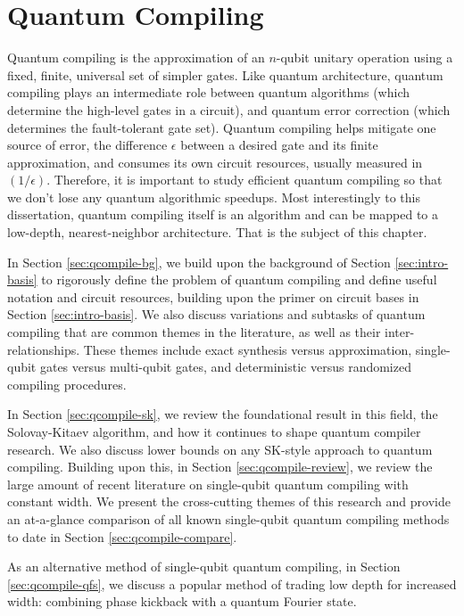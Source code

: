 \chapter{Quantum Compiling}
\label{chap:qcompile}

Quantum compiling is the approximation of an $n$-qubit
unitary operation using a fixed, finite, universal set
of simpler gates. Like quantum architecture, quantum
compiling plays an intermediate role between quantum
algorithms (which determine the high-level gates in a circuit),
and quantum error correction (which determines the
fault-tolerant gate set).
Quantum compiling helps mitigate one source of error,
the difference $\epsilon$ between a desired gate and its
finite approximation,
and consumes its own circuit resources, usually measured in
$(1 / \epsilon)$.
Therefore, it is important to study efficient quantum 
compiling so that we don't lose any quantum algorithmic speedups.
Most interestingly to this dissertation, quantum compiling itself
is an algorithm and can be mapped to a low-depth, nearest-neighbor
architecture. That is the subject of this chapter.

In Section \ref{sec:qcompile-bg}, we build upon the background
of Section \ref{sec:intro-basis} to rigorously define the problem of
quantum compiling and define useful notation and circuit resources,
building upon the primer on circuit bases in Section \ref{sec:intro-basis}.
We also discuss
variations and subtasks of quantum compiling that are common themes
in the literature, as well as their inter-relationships.
These themes include exact synthesis versus approximation,
single-qubit gates versus multi-qubit gates, and deterministic
versus randomized compiling procedures.

In Section \ref{sec:qcompile-sk}, we review the foundational
result in this field, the Solovay-Kitaev algorithm, and how it
continues to shape quantum compiler research. We also discuss
lower bounds on any SK-style approach to quantum compiling.
Building upon this,
in Section \ref{sec:qcompile-review}, we review the large
amount of recent literature on single-qubit quantum compiling with
constant width. We present
the cross-cutting themes of this research and provide an
at-a-glance comparison of all known single-qubit quantum compiling methods
to date in Section \ref{sec:qcompile-compare}.

As an alternative method of single-qubit quantum compiling,
in Section \ref{sec:qcompile-qfs}, we
discuss a popular method of trading low depth for increased
width: combining phase kickback with a quantum Fourier state.

